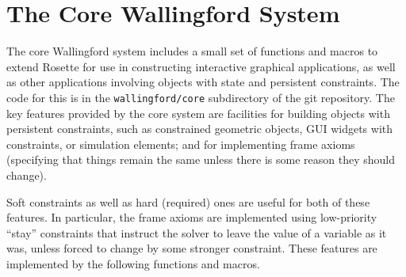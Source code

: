 \documentclass{sig-alternate-05-2015}
\begin{document}
\pagebreak

\section{The Core Wallingford System}
\label{sec:core-wallingford}

The core Wallingford system includes a small set of functions and macros to
extend Rosette for use in constructing interactive graphical applications,
as well as other applications involving objects with state and persistent
constraints.  The code for this is in the \verb|wallingford/core|
subdirectory of the git repository.  The key features provided by the core
system are facilities for building objects with persistent constraints,
such as constrained geometric objects, GUI widgets with constraints, or
simulation elements; and for implementing frame axioms (specifying that
things remain the same unless there is some reason they should change).

Soft constraints as well as hard (required) ones are useful for both of
these features.  In particular, the frame axioms are implemented using
low-priority ``stay'' constraints that instruct the solver to leave the
value of a variable as it was, unless forced to change by some stronger
constraint.  These features are implemented by the following functions and
macros.
\end{document}
